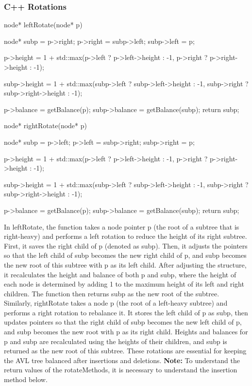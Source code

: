 \documentclass{report}
\begin{document}
\subsubsection{C++ Rotations}
\bigbreak \noindent 
\begin{cppcode}
    node* leftRotate(node* p) {
        node* subp = p->right;
        p->right = subp->left;
        subp->left = p;

        p->height = 1 + 
            std::max(p->left ? p->left->height : -1, 
                    p->right ? p->right->height : -1);

        subp->height = 1 + 
            std::max(subp->left ? subp->left->height : -1, 
                    subp->right ? subp->right->height : -1);

        p->balance = getBalance(p);
        subp->balance = getBalance(subp);
        return subp;
    }

    node* rightRotate(node* p) {
        node* subp = p->left;
        p->left = subp->right;
        subp->right = p;

        p->height = 1 + 
            std::max(p->left ? p->left->height : -1, 
                    p->right ? p->right->height : -1);

        subp->height = 1 + 
            std::max(subp->left ? subp->left->height : -1, 
                    subp->right ? subp->right->height : -1);

        p->balance = getBalance(p);
        subp->balance = getBalance(subp);
        return subp;
    }
\end{cppcode}
\bigbreak \noindent 
In leftRotate, the function takes a node pointer p (the root of a subtree that is right-heavy) and performs a left rotation to reduce the height of its right subtree. First, it saves the right child of p (denoted as subp). Then, it adjusts the pointers so that the left child of subp becomes the new right child of p, and subp becomes the new root of this subtree with p as its left child. After adjusting the structure, it recalculates the height and balance of both p and subp, where the height of each node is determined by adding 1 to the maximum height of its left and right children. The function then returns subp as the new root of the subtree.
\bigbreak \noindent 
Similarly, rightRotate takes a node p (the root of a left-heavy subtree) and performs a right rotation to rebalance it. It stores the left child of p as subp, then updates pointers so that the right child of subp becomes the new left child of p, and subp becomes the new root with p as its right child. Heights and balances for p and subp are recalculated using the heights of their children, and subp is returned as the new root of this subtree. These rotations are essential for keeping the AVL tree balanced after insertions and deletions.
\bigbreak \noindent 
\textbf{Note:} To understand the return values of the rotateMethods, it is necessary to understand the insertion method below.
\end{document}
